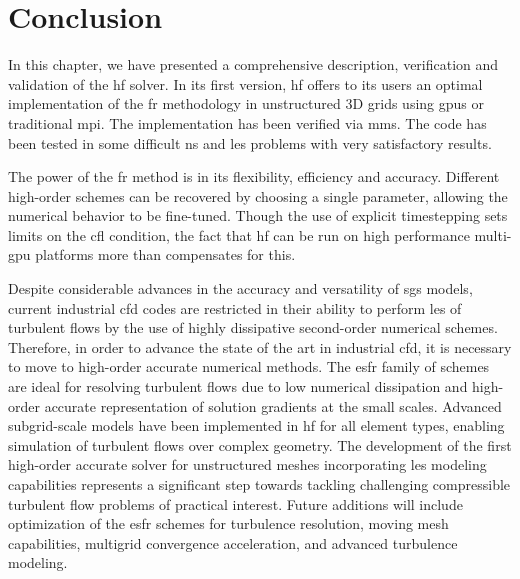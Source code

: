 
\section{Conclusion}
\label{sec:conclusion_hf}

In this chapter, we have presented a comprehensive description, verification and validation of the \gls{hf} solver. In its first version, \gls{hf} offers to its users an optimal implementation of the \gls{fr} methodology in unstructured 3D grids using \gls{gpu}s or traditional \gls{mpi}. The implementation has been verified via \gls{mms}. The code has been tested in some difficult \gls{ns} and \gls{les} problems with very satisfactory results.

The power of the \gls{fr} method is in its flexibility, efficiency and accuracy.
Different high-order schemes can be recovered by choosing a single parameter, allowing the numerical behavior to be fine-tuned.
Though the use of explicit timestepping sets limits on the \gls{cfl} condition, the fact that \gls{hf} can be run on high performance multi-\gls{gpu} platforms more than compensates for this.


Despite considerable advances in the accuracy and versatility of \gls{sgs} models, current industrial \gls{cfd} codes are restricted in their ability to perform \gls{les} of turbulent flows by the use of highly dissipative second-order numerical schemes.
Therefore, in order to advance the state of the art in industrial \gls{cfd}, it is necessary to move to high-order accurate numerical methods.
The \gls{esfr} family of schemes are ideal for resolving turbulent flows due to low numerical dissipation and high-order accurate representation of solution gradients at the small scales.
Advanced subgrid-scale models have been implemented in \gls{hf} for all element types, enabling simulation of turbulent flows over complex geometry.
The development of the first high-order accurate solver for unstructured meshes incorporating \gls{les} modeling capabilities represents a significant step towards tackling challenging compressible turbulent flow problems of practical interest.
Future additions will include optimization of the \gls{esfr} schemes for turbulence resolution, moving mesh capabilities,  multigrid convergence acceleration, and advanced turbulence modeling.